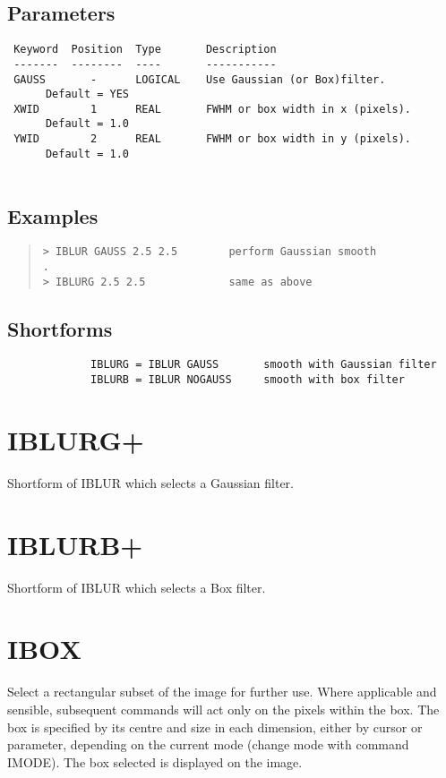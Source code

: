 \documentclass{book}
\renewcommand{\_}{{\tt\char'137}}     %
\begin{document}
\subsection{Parameters}
\begin{verbatim}
 Keyword  Position  Type       Description
 -------  --------  ----       -----------
 GAUSS       -      LOGICAL    Use Gaussian (or Box)filter.
      Default = YES
 XWID        1      REAL       FWHM or box width in x (pixels).
      Default = 1.0
 YWID        2      REAL       FWHM or box width in y (pixels).
      Default = 1.0
 
\end{verbatim}\subsection{Examples}
\begin{quote}\begin{verbatim}
> IBLUR GAUSS 2.5 2.5        perform Gaussian smooth
.
> IBLURG 2.5 2.5             same as above
\end{verbatim}\end{quote}
\subsection{Shortforms}
\begin{verbatim}
             IBLURG = IBLUR GAUSS       smooth with Gaussian filter
             IBLURB = IBLUR NOGAUSS     smooth with box filter
\end{verbatim}
\section{IBLURG+}
Shortform of IBLUR which selects a Gaussian filter.
 
\section{IBLURB+}
Shortform of IBLUR which selects a Box filter.
 
\section{IBOX}
Select a rectangular subset of the image for further use. Where
applicable and sensible, subsequent commands will act only on the
pixels within the box. The box is specified by its centre and
size in each dimension, either by cursor or parameter, depending
on the current mode (change mode with command IMODE). The box
selected is displayed on the image.
 
\end{document}
